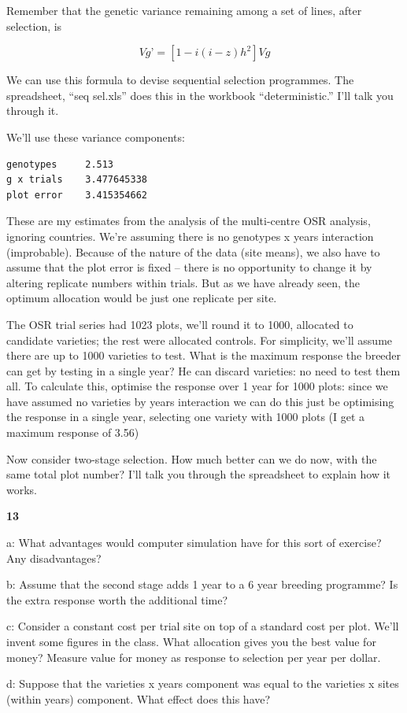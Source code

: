 \documentclass[
]{book}
\makeatletter
\newenvironment{kframe}{%
\medskip{}
\setlength{\fboxsep}{.8em}
 \def\at@end@of@kframe{}%
 \ifinner\ifhmode%
  \def\at@end@of@kframe{\end{minipage}}%
  \begin{minipage}{\columnwidth}%
 \fi\fi%
 \def\FrameCommand##1{\hskip\@totalleftmargin \hskip-\fboxsep
 \colorbox{shadecolor}{##1}\hskip-\fboxsep
     \hskip-\linewidth \hskip-\@totalleftmargin \hskip\columnwidth}%
 \MakeFramed {\advance\hsize-\width
   \@totalleftmargin\z@ \linewidth\hsize
   \@setminipage}}%
 {\par\unskip\endMakeFramed%
 \at@end@of@kframe}
\newenvironment{rmdblock}[1]
  {
  \begin{itemize}
  \renewcommand{\labelitemi}{
    \raisebox{-.7\height}[0pt][0pt]{
      {\setkeys{Gin}{width=3em,keepaspectratio}\texttt{[image: images/\#1]}}
    }
  }
  \setlength{\fboxsep}{1em}
  \begin{kframe}
  \item
  }
  {
  \end{kframe}
  \end{itemize}
  }
\newenvironment{rmdquiz}
  {\begin{rmdblock}{quiz}}
  {\end{rmdblock}}
\makeatother
\begin{document}
Remember that the genetic variance remaining among a set of lines, after selection, is

\[Vg’ = [1-i(i-z)h^2 ]Vg\]

We can use this formula to devise sequential selection programmes. The spreadsheet, ``seq sel.xls'' does this in the workbook ``deterministic.'' I'll talk you through it.

We'll use these variance components:

\begin{verbatim}
genotypes     2.513
g x trials    3.477645338
plot error    3.415354662
\end{verbatim}

These are my estimates from the analysis of the multi-centre OSR analysis, ignoring countries. We're assuming there is no genotypes x years interaction (improbable). Because of the nature of the data (site means), we also have to assume that the plot error is fixed -- there is no opportunity to change it by altering replicate numbers within trials. But as we have already seen, the optimum allocation would be just one replicate per site.

The OSR trial series had 1023 plots, we'll round it to 1000, allocated to candidate varieties; the rest were allocated controls. For simplicity, we'll assume there are up to 1000 varieties to test. What is the maximum response the breeder can get by testing in a single year? He can discard varieties: no need to test them all. To calculate this, optimise the response over 1 year for 1000 plots: since we have assumed no varieties by years interaction we can do this just be optimising the response in a single year, selecting one variety with 1000 plots (I get a maximum response of 3.56)

Now consider two-stage selection. How much better can we do now, with the same total plot number? I'll talk you through the spreadsheet to explain how it works.

\begin{rmdquiz}
\textbf{13}

a: What advantages would computer simulation have for this sort of exercise? Any disadvantages?

b: Assume that the second stage adds 1 year to a 6 year breeding programme? Is the extra response worth the additional time?

c: Consider a constant cost per trial site on top of a standard cost per plot. We'll invent some figures in the class. What allocation gives you the best value for money? Measure value for money as response to selection per year per dollar.

d: Suppose that the varieties x years component was equal to the varieties x sites (within years) component. What effect does this have?
\end{rmdquiz}
\end{document}
